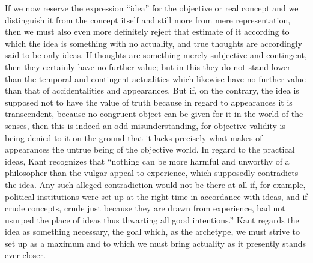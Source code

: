 If we now reserve the expression “idea”
for the objective or real concept
and we distinguish it from the concept itself
and still more from mere representation,
then we must also even more definitely reject
that estimate of it according to which
the idea is something with no actuality,
and true thoughts are accordingly said to be only ideas.
If thoughts are something merely subjective and contingent,
then they certainly have no further value;
but in this they do not stand lower
than the temporal and contingent actualities
which likewise have no further value than
that of accidentalities and appearances.
But if, on the contrary, the idea is
supposed not to have the value of truth
because in regard to appearances it is transcendent,
because no congruent object can be given for it
in the world of the senses,
then this is indeed an odd misunderstanding,
for objective validity is being denied to it
on the ground that it lacks precisely what makes
of appearances the untrue being of the objective world.
In regard to the practical ideas, Kant recognizes that
“nothing can be more harmful and unworthy of
a philosopher than the vulgar appeal to experience,
which supposedly contradicts the idea.
Any such alleged contradiction would not be there at all
if, for example, political institutions were set up
at the right time in accordance with ideas,
and if crude concepts, crude just
because they are drawn from experience,
had not usurped the place of ideas
thus thwarting all good intentions.”
Kant regards the idea as something necessary,
the goal which, as the archetype,
we must strive to set up as a maximum
and to which we must bring actuality
as it presently stands ever closer.


